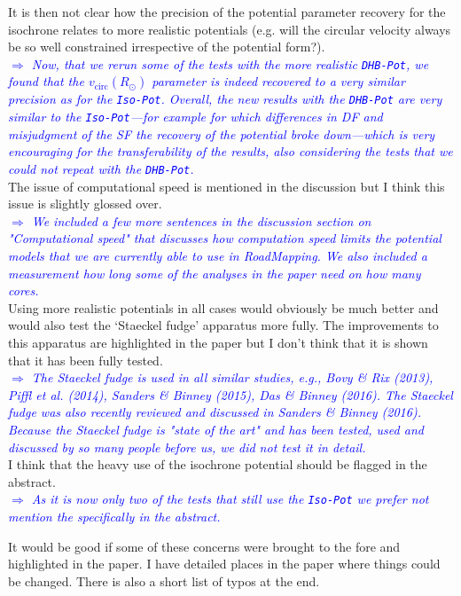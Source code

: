 \documentclass[10pt,a4paper]{article}
\newcommand{\Comment}[1]{\textsl{\textcolor{Blue}{$\Longrightarrow$ {#1}}}}
\newcommand{\RM}{{\sl RoadMapping}}
\begin{document}
\begin{itemize}
It is then not clear how the precision of the potential parameter recovery for the isochrone relates to more realistic potentials (e.g. will the circular velocity always be so well constrained irrespective of the potential form?). \\\Comment{Now, that we rerun some of the tests with the more realistic \texttt{DHB-Pot}, we found that the $v_\text{circ}(R_\odot)$ parameter is indeed recovered to a very similar precision as for the \texttt{Iso-Pot}. Overall, the new results with the \texttt{DHB-Pot} are very similar to the \texttt{Iso-Pot}---for example for which differences in DF and misjudgment of the SF the recovery of the potential broke down---which is very encouraging for the transferability of the results, also considering the tests that we could not repeat with the \texttt{DHB-Pot}.}\\
The issue of computational speed is mentioned in the discussion but I think this issue is slightly glossed over. \\\Comment{We included a few more sentences in the discussion section on "Computational speed" that discusses how computation speed limits the potential models that we are currently able to use in \RM{}. We also included a measurement how long some of the analyses in the paper need on how many cores.}\\
Using more realistic potentials in all cases would obviously be much better and would also test the `Staeckel fudge'
apparatus more fully. The improvements to this apparatus are highlighted in the paper but I don't think that it is shown that it has been fully tested. \\\Comment{The \emph{Staeckel fudge} is used in all similar studies, e.g., Bovy \& Rix (2013), Piffl et al. (2014), Sanders \& Binney (2015), Das \& Binney (2016). The \emph{Staeckel fudge} was also recently reviewed and discussed in Sanders \& Binney (2016). Because the \emph{Staeckel fudge} is "state of the art" and has been tested, used and discussed by so many people before us, we did not test it in detail.}\\I think that the heavy use of the isochrone potential should be flagged in the abstract. \\\Comment{As it is now only two of the tests that still use the \texttt{Iso-Pot} we prefer not mention the \text{Iso-Pot} specifically in the abstract.}
\end{itemize}

It would be good if some of these concerns were brought to the fore and highlighted
in the paper. I have detailed places in the paper where things could be changed.
There is also a short list of typos at the end.\\\\
\end{document}
